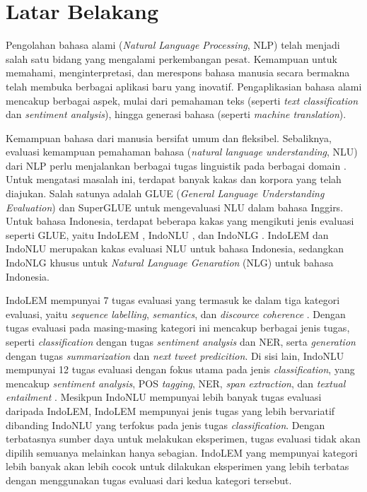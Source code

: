 \section{Latar Belakang}
\label{sec:latar-belakang}

Pengolahan bahasa alami (\textit{Natural Language Processing}, NLP) telah menjadi salah satu bidang yang mengalami perkembangan pesat. Kemampuan untuk memahami, menginterpretasi, dan merespons bahasa manusia secara bermakna telah membuka berbagai aplikasi baru yang inovatif. Pengaplikasian bahasa alami mencakup berbagai aspek, mulai dari pemahaman teks (seperti \textit{text classification} dan \textit{sentiment analysis}), hingga generasi bahasa (seperti \textit{machine translation}).

Kemampuan bahasa dari manusia bersifat umum dan fleksibel. Sebaliknya, evaluasi kemampuan pemahaman bahasa (\textit{natural language understanding}, NLU) dari NLP perlu menjalankan berbagai tugas linguistik pada berbagai domain \parencite{glue}. Untuk mengatasi masalah ini, terdapat banyak kakas dan korpora yang telah diajukan. Salah satunya adalah GLUE (\textit{General Language Understanding Evaluation}) \parencite{glue} dan SuperGLUE \parencite{superglue} untuk mengevaluasi NLU dalam bahasa Inggirs. Untuk bahasa Indonesia, terdapat beberapa kakas yang mengikuti jenis evaluasi seperti GLUE, yaitu IndoLEM \parencite{indolem}, IndoNLU \parencite{indonlu}, dan IndoNLG \parencite{indonlg}. IndoLEM dan IndoNLU merupakan kakas evaluasi NLU untuk bahasa Indonesia, sedangkan IndoNLG khusus untuk \textit{Natural Language Genaration} (NLG) untuk bahasa Indonesia.

IndoLEM mempunyai 7 tugas evaluasi yang termasuk ke dalam tiga kategori evaluasi, yaitu \textit{sequence labelling}, \textit{semantics}, dan \textit{discource coherence} \parencite{indolem}. Dengan tugas evaluasi pada masing-masing kategori ini mencakup berbagai jenis tugas, seperti \textit{classification} dengan tugas \textit{sentiment analysis} dan NER, serta \textit{generation} dengan tugas \textit{summarization} dan \textit{next tweet predicition}. Di sisi lain, IndoNLU mempunyai 12 tugas evaluasi dengan fokus utama pada jenis \textit{classification}, yang mencakup \textit{sentiment analysis}, POS \textit{tagging}, NER, \textit{span extraction}, dan \textit{textual entailment} \parencite{indonlu}. Mesikpun IndoNLU mempunyai lebih banyak tugas evaluasi daripada IndoLEM, IndoLEM mempunyai jenis tugas yang lebih bervariatif dibanding IndoNLU yang terfokus pada jenis tugas \textit{classification}. Dengan terbatasnya sumber daya untuk melakukan eksperimen, tugas evaluasi tidak akan dipilih semuanya melainkan hanya sebagian. IndoLEM yang mempunyai kategori lebih banyak akan lebih cocok untuk dilakukan eksperimen yang lebih terbatas dengan menggunakan tugas evaluasi dari kedua kategori tersebut.

